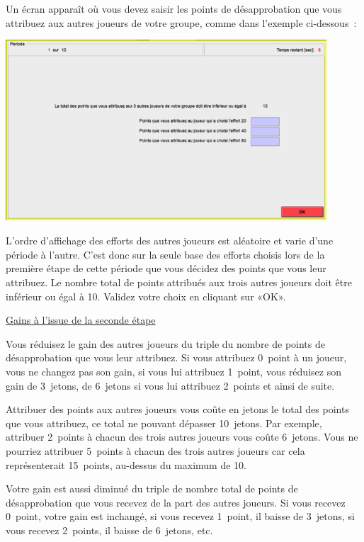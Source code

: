 \begin{Article}
\begin{refsection}[Lebourges]
\begin{appendices}
Un écran apparaît où vous devez saisir les points de désapprobation que
vous attribuez aux autres joueurs de votre groupe, comme dans l'exemple
ci-dessous~:

\vspace{0,2cm}

\includegraphics[width = 0.9\textwidth]{05_fig7-annexII.png}

L'ordre d'affichage des efforts des autres joueurs est aléatoire et
varie d'une période à l'autre. C'est donc sur la seule base des efforts
choisis lors de la première étape de cette période que vous décidez des
points que vous leur attribuez. Le nombre total de points attribués aux
trois autres joueurs doit être inférieur ou égal à 10. Validez votre
choix en cliquant sur «OK».
\vspace{0,2cm}

\ul{Gains à l'issue de la seconde étape}

\vspace{0,2cm}
Vous réduisez le gain des autres joueurs du triple du nombre de points
de désapprobation que vous leur attribuez. Si vous attribuez 0~point à
un joueur, vous ne changez pas son gain, si vous lui attribuez 1~point,
vous réduisez son gain de 3~jetons, de 6~jetons si vous lui attribuez
2~points et ainsi de suite.

Attribuer des points aux autres joueurs vous coûte en jetons le total
des points que vous attribuez, ce total ne pouvant dépasser 10~jetons.
Par exemple, attribuer 2~points à chacun des trois autres joueurs vous
coûte 6~jetons. Vous ne pourriez attribuer 5~points à chacun des trois
autres joueurs car cela représenterait 15~points, au-dessus du maximum
de 10.

Votre gain est aussi diminué du triple de nombre total de points de
désapprobation que vous recevez de la part des autres joueurs. Si vous
recevez 0~point, votre gain est inchangé, si vous recevez 1~point, il
baisse de 3~jetons, si vous recevez 2~points, il baisse de 6~jetons,
etc.


\end{appendices}
\end{refsection}
\end{Article}
